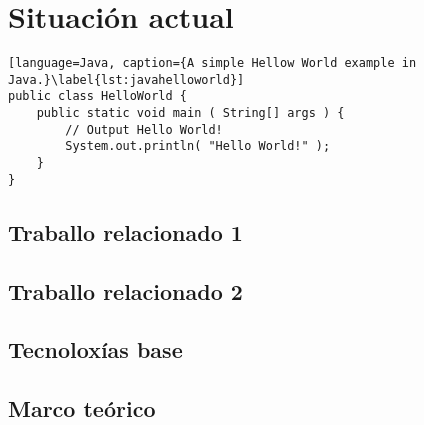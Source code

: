 
\chapter{Situación actual} %
\label{sec:related}


{
\color{gray}
\Blindtext[2][1]
}

\begin{lstlisting}[language=Java, caption={A simple Hellow World example in Java.}\label{lst:javahelloworld}]
public class HelloWorld {
	public static void main ( String[] args ) {
		// Output Hello World!
		System.out.println( "Hello World!" );
	}
}
\end{lstlisting}

{
\color{gray}
\Blindtext[1][1]
}

\section{Traballo relacionado 1}
\label{sec:related:sec1}

{
\color{gray}
\Blindtext[2][2]
}

\section{Traballo relacionado 2}
\label{sec:related:sec2}
{
\color{gray}
\Blindtext[3][2]
}

\section{Tecnoloxías base}
\label{sec:related:sec3}
{
\color{gray}
\Blindtext[4][2]
}

\section{Marco teórico}
\label{sec:related:conclusion}
{
\color{gray}
\Blindtext[2][1]
}